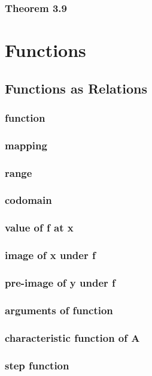 \documentclass[a4paper]{article}
\begin{document}
\subsubsection*{Theorem 3.9}



\newpage
\section{Functions}   %
\subsection{Functions as Relations}   %
\subsubsection*{function}
\subsubsection*{mapping}
\subsubsection*{range}
\subsubsection*{codomain}
\subsubsection*{value of f at x}
\subsubsection*{image of x under f}
\subsubsection*{pre-image of y under f}
\subsubsection*{arguments of function}
\subsubsection*{characteristic function of A}
\subsubsection*{step function}
\end{document}
